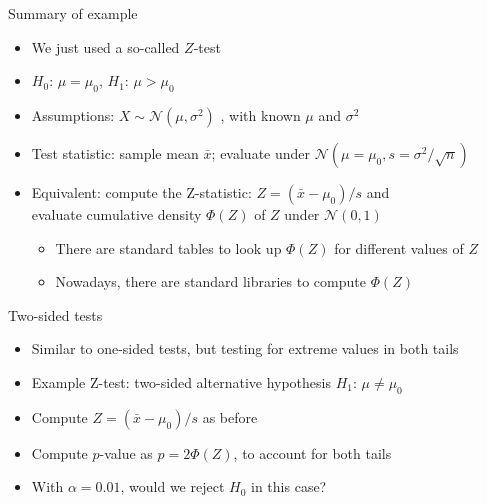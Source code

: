 \begin{frame}[c]{Summary of example}

\begin{itemize}
\item We just used a so-called \alert{$Z$-test}
\item $H_0$: $\mu=\mu_0$, $H_1$: $\mu>\mu_0$  
\item Assumptions: $X \sim \mathcal{N}(\mu,\sigma^2)$ , with known $\mu$ and $\sigma^2$

\medskip
\pause
\item \alert{Test statistic}: sample mean $\bar{x}$; evaluate under 
$\mathcal{N}(\mu=\mu_0,s=\sigma^2/\sqrt{n})$
\pause
\smallskip
\item Equivalent: compute the \alert{Z-statistic}: $Z = (\bar{x}-\mu_0)/s$
and\\
evaluate cumulative density $\Phi(Z)$ of $Z$
under $\mathcal{N}(0,1)$
\medskip
\pause
\begin{itemize}
\item There are standard tables to look up $\Phi(Z)$ for different values of $Z$
\item Nowadays, there are standard libraries to compute $\Phi(Z)$
\end{itemize}

\end{itemize}

\end{frame}
\begin{frame}[c]{Two-sided tests}


\vspace*{-0.2cm}
\begin{center}

\end{center}
\vspace*{-0.2cm}

\begin{itemize}
\item Similar to one-sided tests, but testing for extreme values in both tails
\item Example Z-test: two-sided alternative hypothesis $H_1$:
$\mu \neq \mu_0$
\pause
\smallskip
\item Compute $Z = (\bar{x}-\mu_0)/s$ as before
\item Compute $p$-value as $p = 2\Phi(Z)$, to account for both tails
\pause 
\medskip
\item With $\alpha = 0.01$, would we reject $H_0$ in this case? \hands
\end{itemize}

\end{frame}

